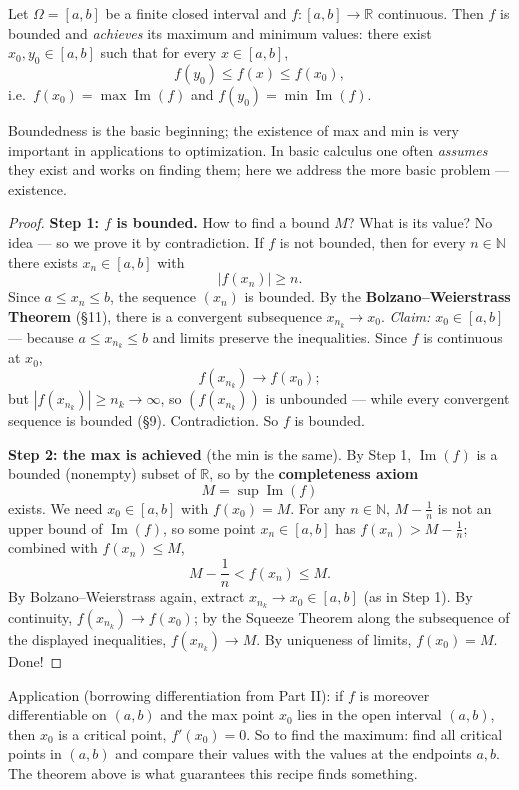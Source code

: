 \documentclass[11pt]{report}
\begin{document}
\begin{thmbox}
Let $\Omega = [a,b]$ be a finite closed interval and $f: [a,b] \to \mathbb{R}$ continuous. Then $f$ is bounded and \emph{achieves} its maximum and minimum values: there exist $x_0, y_0 \in [a,b]$ such that for every $x \in [a,b]$,
\[
f(y_0) \leq f(x) \leq f(x_0),
\]
i.e.\ $f(x_0) = \max \operatorname{Im}(f)$ and $f(y_0) = \min \operatorname{Im}(f)$.
\end{thmbox}

Boundedness is the basic beginning; the existence of max and min is very important in applications to optimization. In basic calculus one often \emph{assumes} they exist and works on finding them; here we address the more basic problem --- existence.

\begin{proof}
\textbf{Step 1: $f$ is bounded.} How to find a bound $M$? What is its value? No idea --- so we prove it by contradiction. If $f$ is not bounded, then for every $n \in \mathbb{N}$ there exists $x_n \in [a,b]$ with
\[
|f(x_n)| \geq n.
\]
Since $a \leq x_n \leq b$, the sequence $(x_n)$ is bounded. By the \textbf{Bolzano--Weierstrass Theorem} (\S 11), there is a convergent subsequence $x_{n_k} \to x_0$. \emph{Claim: $x_0 \in [a,b]$} --- because $a \leq x_{n_k} \leq b$ and limits preserve the inequalities. Since $f$ is continuous at $x_0$,
\[
f(x_{n_k}) \longrightarrow f(x_0);
\]
but $|f(x_{n_k})| \geq n_k \to \infty$, so $(f(x_{n_k}))$ is unbounded --- while every convergent sequence is bounded (\S 9). Contradiction. So $f$ is bounded.

\textbf{Step 2: the max is achieved} (the min is the same). By Step 1, $\operatorname{Im}(f)$ is a bounded (nonempty) subset of $\mathbb{R}$, so by the \textbf{completeness axiom}
\[
M = \sup \operatorname{Im}(f)
\]
exists. We need $x_0 \in [a,b]$ with $f(x_0) = M$. For any $n \in \mathbb{N}$, $M - \tfrac1n$ is not an upper bound of $\operatorname{Im}(f)$, so some point $x_n \in [a,b]$ has $f(x_n) > M - \tfrac1n$; combined with $f(x_n) \leq M$,
\[
M - \frac1n < f(x_n) \leq M.
\]
By Bolzano--Weierstrass again, extract $x_{n_k} \to x_0 \in [a,b]$ (as in Step 1). By continuity, $f(x_{n_k}) \to f(x_0)$; by the Squeeze Theorem along the subsequence of the displayed inequalities, $f(x_{n_k}) \to M$. By uniqueness of limits, $f(x_0) = M$. Done!
\end{proof}

\begin{rembox}
Application (borrowing differentiation from Part II): if $f$ is moreover differentiable on $(a,b)$ and the max point $x_0$ lies in the open interval $(a,b)$, then $x_0$ is a critical point, $f'(x_0) = 0$. So to find the maximum: find all critical points in $(a,b)$ and compare their values with the values at the endpoints $a, b$. The theorem above is what guarantees this recipe finds something.
\end{rembox}
\end{document}
